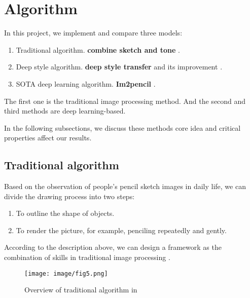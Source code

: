 \section{Algorithm}
In this project, we implement and compare three models:
\begin{enumerate}
  \item Traditional algorithm. \textbf{combine sketch and tone} \cite{2012_Lu_combine}.
  \item Deep style algorithm. \textbf{deep style transfer} \cite{CVPR2016_Gatys_stcnn} and its improvement \cite{2020_Huang_sdf}.
  \item SOTA deep learning algorithm. \textbf{Im2pencil} \cite{2019CVPR_Li_img2pencil}.
\end{enumerate}
The first one is the traditional image processing method. And the second and third methods are deep learning-based.

In the following subsections, we discuss these methods core idea and critical properties affect our results.

\subsection{Traditional algorithm}
Based on the observation of people's pencil sketch images in daily life, we can divide the drawing process into two steps:
\begin{enumerate}
    \item To outline the shape of objects.
    \item To render the picture, for example, penciling repeatedly and gently.
\end{enumerate}
According to the description above, we can design a framework as the combination of skills in traditional image processing .
\begin{figure}
    \centering
    \texttt{[image: image/fig5.png]}
    \caption{Overview of traditional algorithm in \cite{2012_Lu_combine}}
    \label{fig5}
\end{figure}


